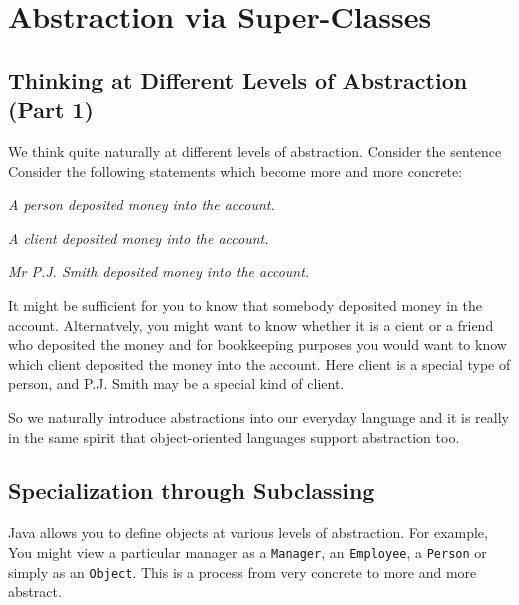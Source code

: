 \section{Abstraction via Super-Classes}


\subsection{Thinking at Different Levels of Abstraction (Part 1)}

We think quite naturally at different levels of abstraction. Consider the sentence
Consider the following statements which become more and more concrete:

\vspace{2mm}
\centerline{\em A person deposited money into the account.}
\vspace{2mm}

\centerline{\em A client deposited money into the account.}
\vspace{2mm}

\centerline{\em Mr P.J. Smith deposited money into the account.}
\vspace{2mm}

It might be sufficient for you to know that somebody deposited money in the account.
Alternatvely, you might want to know whether it is a cient or a friend who deposited
the money and for bookkeeping purposes you would want to know which client deposited 
the money into the account. Here client is a special type of person, and P.J. Smith
may be a special kind of client.

So we naturally introduce abstractions into our everyday language and it is really in
the same spirit that object-oriented languages support abstraction too. 


\subsection{Specialization through Subclassing \label{secSubClassing}}

Java allows you to define objects at various levels of abstraction. For example,
You might view a particular manager as a \verb+Manager+, an \verb+Employee+, a 
\verb+Person+ or simply as an \verb+Object+. This is a process from very concrete
to more and more abstract. 

